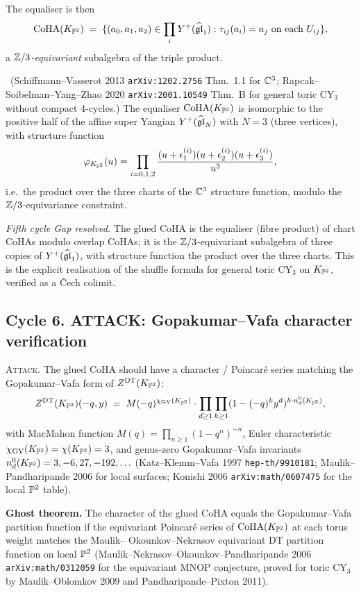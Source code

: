 The equaliser is then
\[
\mathrm{CoHA}(K_{\mathbb{P}^2})\;=\;\{(a_0,a_1,a_2)\in\prod_i Y^+(\widehat{\mathfrak{gl}}_1):
\tau_{ij}(a_i)=a_j\text{ on each }U_{ij}\},
\]
a \emph{$\mathbb{Z}/3$-equivariant} subalgebra of the triple product.

\ClaimStatusTheorem\ (Schiffmann--Vasserot 2013 \texttt{arXiv:1202.2756}
Thm.\ 1.1 for $\mathbb{C}^3$; Rapcak--Soibelman--Yang--Zhao 2020 \texttt{arXiv:2001.10549}
Thm.\ B for general toric CY$_3$ without compact $4$-cycles.)
The equaliser $\mathrm{CoHA}(K_{\mathbb{P}^2})$ is isomorphic to the positive half of
the affine super Yangian $Y^+(\widehat{\mathfrak{gl}}_N)$ with $N=3$ (three vertices), with
structure function
\[
\varphi_{K_{\mathbb{P}^2}}(u)=\prod_{i=0,1,2}\frac{(u+\epsilon_1^{(i)})(u+
\epsilon_2^{(i)})(u+\epsilon_3^{(i)})}{u^3},
\]
i.e.\ the product over the three charts of the $\mathbb{C}^3$ structure
function, modulo the $\mathbb{Z}/3$-equivariance constraint.

\emph{Fifth cycle Gap resolved.} The glued CoHA is the equaliser
(fibre product) of chart CoHAs modulo overlap CoHAs; it is the
$\mathbb{Z}/3$-equivariant subalgebra of three copies of $Y^+(\widehat{\mathfrak{gl}}_1)$, with
structure function the product over the three charts. This is the
explicit realisation of the shuffle formula for general toric CY$_3$ on
$K_{\mathbb{P}^2}$, verified as a \v Cech colimit.

\subsection*{Cycle 6. ATTACK: Gopakumar--Vafa character verification}

\textsc{Attack.} The glued CoHA should have a character / Poincar\'e
series matching the Gopakumar--Vafa form of $Z^{\mathrm{DT}}(K_{\mathbb{P}^2})$:
\[
Z^{\mathrm{DT}}(K_{\mathbb{P}^2})(-q,y)\;=\;
M(-q)^{\chi_{\mathrm{GV}}(K_{\mathbb{P}^2})}\cdot
\prod_{d\geq 1}\prod_{k\geq 1}(1-(-q)^ky^d)^{k\cdot n_d^0(K_{\mathbb{P}^2})},
\]
with MacMahon function $M(q)=\prod_{n\geq 1}(1-q^n)^{-n}$, Euler
characteristic $\chi_{\mathrm{GV}}(K_{\mathbb{P}^2})=\chi(K_{\mathbb{P}^2})=3$, and genus-zero
Gopakumar--Vafa invariants
$n_d^0(K_{\mathbb{P}^2})=3,-6,27,-192,\ldots$
(Katz--Klemm--Vafa 1997 \texttt{hep-th/9910181};
Maulik--Pandharipande 2006 for local surfaces;
Konishi 2006 \texttt{arXiv:math/0607475} for the local $\mathbb{P}^2$ table).

\textbf{Ghost theorem.} The character of the glued CoHA equals the
Gopakumar--Vafa partition function if the equivariant Poincar\'e series
of $\mathrm{CoHA}(K_{\mathbb{P}^2})$ at each torus weight matches the Maulik--
Okounkov--Nekrasov equivariant DT partition function on local $\mathbb{P}^2$
(Maulik--Nekrasov--Okounkov--Pandharipande 2006 \texttt{arXiv:math/0312059}
for the equivariant MNOP conjecture, proved for toric CY$_3$ by
Maulik--Oblomkov 2009 and Pandharipande--Pixton 2011).

